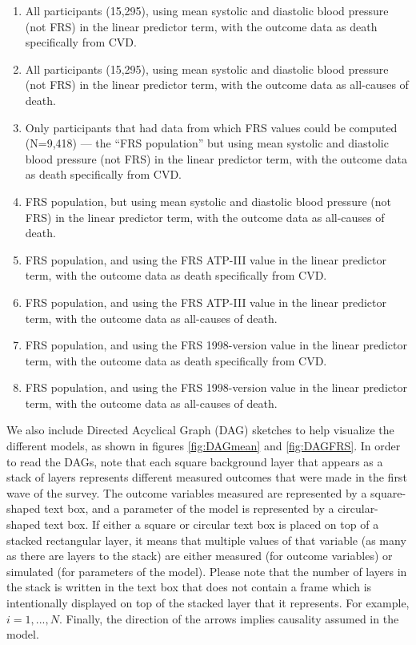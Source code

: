 \documentclass[
]{article}
\begin{document}
\begin{enumerate}
\item All participants (15,295), using mean systolic and diastolic blood pressure (not FRS) in the linear predictor term, with the outcome data as death specifically from CVD.
\item All participants (15,295), using mean systolic and diastolic blood pressure (not FRS) in the linear predictor term, with the outcome data as all-causes of death.
\item Only participants that had data from which FRS values could be computed (N=9,418) --- the ``FRS population'' but using mean systolic and diastolic blood pressure (not FRS) in the linear predictor term, with the outcome data as death specifically from CVD.
\item FRS population, but using mean systolic and diastolic blood pressure (not FRS) in the linear predictor term, with the outcome data as all-causes of death.
\item FRS population, and using the FRS ATP-III value in the linear predictor term, with the outcome data as death specifically from CVD.
\item FRS population, and using the FRS ATP-III value in the linear predictor term, with the outcome data as all-causes of death.
\item FRS population, and using the FRS 1998-version value in the linear predictor term, with the outcome data as death specifically from CVD.
\item FRS population, and using the FRS 1998-version value in the linear predictor term, with the outcome data as all-causes of death.
\label{tab:runnums}
\end{enumerate}

We also include Directed Acyclical Graph (DAG) sketches to help
visualize the different models, as shown in figures \ref{fig:DAGmean}
and \ref{fig:DAGFRS}. In order to read the DAGs, note that each square
background layer that appears as a stack of layers represents different
measured outcomes that were made in the first wave of the survey. The
outcome variables measured are represented by a square-shaped text box,
and a parameter of the model is represented by a circular-shaped text
box. If either a square or circular text box is placed on top of a
stacked rectangular layer, it means that multiple values of that
variable (as many as there are layers to the stack) are either measured
(for outcome variables) or simulated (for parameters of the model).
Please note that the number of layers in the stack is written in the
text box that does not contain a frame which is intentionally displayed
on top of the stacked layer that it represents. For example,
\(i=1,...,N\). Finally, the direction of the arrows implies causality
assumed in the model.
\end{document}

